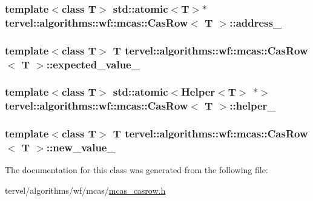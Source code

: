 \subsubsection[{address\+\_\+}]{\setlength{\rightskip}{0pt plus 5cm}template$<$class T$>$ std\+::atomic$<$T$>$$\ast$ {\bf tervel\+::algorithms\+::wf\+::mcas\+::\+Cas\+Row}$<$ T $>$\+::address\+\_\+}\label{classtervel_1_1algorithms_1_1wf_1_1mcas_1_1_cas_row_a8481dc81b0be30ba611a7f4478989710}
\hypertarget{classtervel_1_1algorithms_1_1wf_1_1mcas_1_1_cas_row_a66a7a49d2689691763631b635d0f80b6}{}
\subsubsection[{expected\+\_\+value\+\_\+}]{\setlength{\rightskip}{0pt plus 5cm}template$<$class T$>$ T {\bf tervel\+::algorithms\+::wf\+::mcas\+::\+Cas\+Row}$<$ T $>$\+::expected\+\_\+value\+\_\+}\label{classtervel_1_1algorithms_1_1wf_1_1mcas_1_1_cas_row_a66a7a49d2689691763631b635d0f80b6}
\hypertarget{classtervel_1_1algorithms_1_1wf_1_1mcas_1_1_cas_row_a762b03fb15cb83f591430c393bd3b444}{}
\subsubsection[{helper\+\_\+}]{\setlength{\rightskip}{0pt plus 5cm}template$<$class T$>$ std\+::atomic$<${\bf Helper}$<$T$>$ $\ast$$>$ {\bf tervel\+::algorithms\+::wf\+::mcas\+::\+Cas\+Row}$<$ T $>$\+::helper\+\_\+}\label{classtervel_1_1algorithms_1_1wf_1_1mcas_1_1_cas_row_a762b03fb15cb83f591430c393bd3b444}
\hypertarget{classtervel_1_1algorithms_1_1wf_1_1mcas_1_1_cas_row_adcc297c44b5dafc6b08b9fcf3cdc277e}{}
\subsubsection[{new\+\_\+value\+\_\+}]{\setlength{\rightskip}{0pt plus 5cm}template$<$class T$>$ T {\bf tervel\+::algorithms\+::wf\+::mcas\+::\+Cas\+Row}$<$ T $>$\+::new\+\_\+value\+\_\+}\label{classtervel_1_1algorithms_1_1wf_1_1mcas_1_1_cas_row_adcc297c44b5dafc6b08b9fcf3cdc277e}


The documentation for this class was generated from the following file\+:\begin{DoxyCompactItemize}
\item 
tervel/algorithms/wf/mcas/\hyperlink{mcas__casrow_8h}{mcas\+\_\+casrow.\+h}\end{DoxyCompactItemize}
